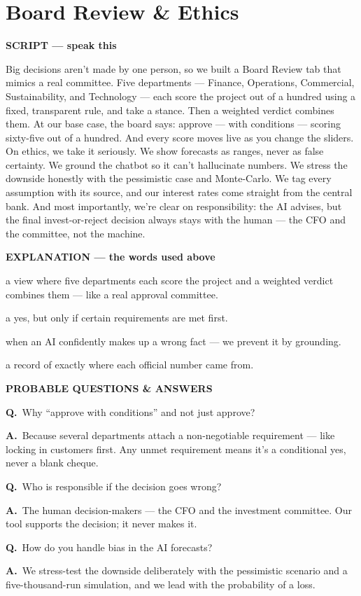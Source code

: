 \documentclass[12pt,a4paper]{article}
\newcommand{\block}[2]{\par\medskip\noindent\textcolor{#1}{\textbf{#2}}\par\nobreak\smallskip}
\newcommand{\SC}{\block{tvblue}{SCRIPT --- speak this}}
\newcommand{\EX}{\block{tvgreen}{EXPLANATION --- the words used above}}
\newcommand{\PQ}{\block{tvamber}{PROBABLE QUESTIONS \& ANSWERS}}
\newcommand{\qa}[2]{\par\noindent\textbf{Q.}~#1\par\noindent\textbf{A.}~#2\par\smallskip}
\newenvironment{terms}{\begin{description}[leftmargin=0pt,itemsep=2pt,font=\normalfont\bfseries]}{\end{description}}
\begin{document}
\section{Board Review \& Ethics}

\SC
Big decisions aren't made by one person, so we built a Board Review tab that mimics a real committee.
Five departments --- Finance, Operations, Commercial, Sustainability, and Technology --- each score the
project out of a hundred using a fixed, transparent rule, and take a stance. Then a weighted verdict
combines them. At our base case, the board says: approve --- with conditions --- scoring sixty-five out
of a hundred. And every score moves live as you change the sliders. On ethics, we take it seriously.
We show forecasts as ranges, never as false certainty. We ground the chatbot so it can't hallucinate
numbers. We stress the downside honestly with the pessimistic case and Monte-Carlo. We tag every
assumption with its source, and our interest rates come straight from the central bank. And most
importantly, we're clear on responsibility: the AI advises, but the final invest-or-reject decision
always stays with the human --- the CFO and the committee, not the machine.

\EX
\begin{terms}
  \item[Board Review:] a view where five departments each score the project and a weighted verdict
  combines them --- like a real approval committee.
  \item[Approve with conditions:] a yes, but only if certain requirements are met first.
  \item[Hallucination:] when an AI confidently makes up a wrong fact --- we prevent it by grounding.
  \item[Data provenance:] a record of exactly where each official number came from.
\end{terms}

\PQ
\qa{Why ``approve with conditions'' and not just approve?}{Because several departments attach a
non-negotiable requirement --- like locking in customers first. Any unmet requirement means it's a
conditional yes, never a blank cheque.}
\qa{Who is responsible if the decision goes wrong?}{The human decision-makers --- the CFO and the
investment committee. Our tool supports the decision; it never makes it.}
\qa{How do you handle bias in the AI forecasts?}{We stress-test the downside deliberately with the
pessimistic scenario and a five-thousand-run simulation, and we lead with the probability of a loss.}
\end{document}
